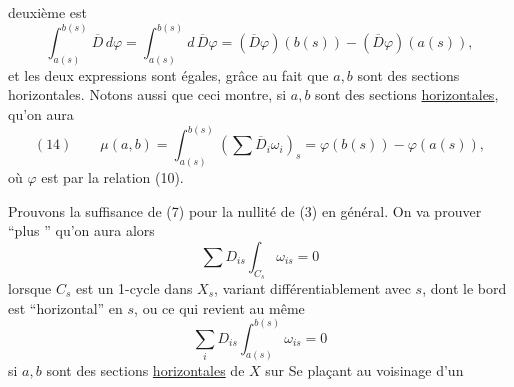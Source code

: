 deuxième est
\[
\int_{a(s)}^{b(s)}\overline D\,d\varphi=\int_{a(s)}^{b(s)}d\,\overline D\varphi=(\overline D\varphi)(b(s))-(\overline D\varphi)(a(s)),
\]
 et les deux expressions sont égales, grâce au fait que $a,b$ sont des sections horizontales. Notons aussi que ceci montre, si $a,b$ sont des sections \uline{horizontales}, qu'on aura
\[
(14)\qquad \mu(a,b)=\int_{a(s)}^{b(s)}\left(\sum\overline D_i\omega_i\right)_s=\varphi(b(s))-\varphi(a(s)),
\]
où $\varphi$ est  par la relation (10).

Prouvons la suffisance de (7) pour la nullité de (3) en général. On va prouver ``plus '' qu'on aura alors
\[
\sum D_{is}\int_{C_s}\omega_{is}=0
\]
lorsque $C_s$ est un 1-cycle dans $X_s$, variant différentiablement avec $s$, dont le bord est ``horizontal'' en $s$, ou ce qui revient au même
\[
\sum_i D_{is}\int_{a(s)}^{b(s)}\omega_{is}=0
\]
si $a,b$ sont des sections \uline{horizontales} de $X$ sur    Se plaçant au voisinage d'un
